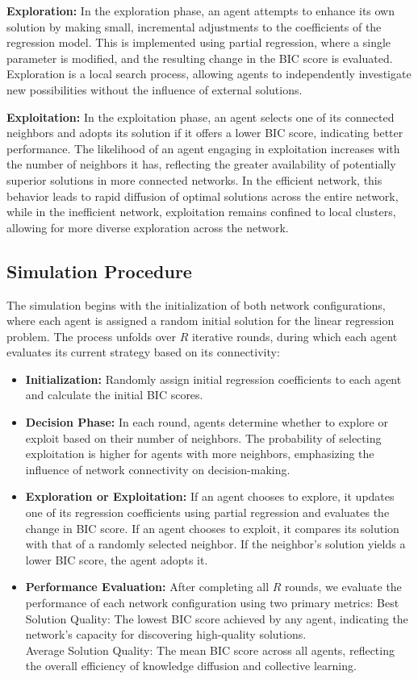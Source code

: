 \documentclass[conference]{IEEEtran}
\begin{document}
\textbf{Exploration: }
In the exploration phase, an agent attempts to enhance its own solution by making small, incremental adjustments to the coefficients of the regression model. This is implemented using partial regression, where a single parameter is modified, and the resulting change in the BIC score is evaluated. Exploration is a local search process, allowing agents to independently investigate new possibilities without the influence of external solutions.

\textbf{Exploitation: }
In the exploitation phase, an agent selects one of its connected neighbors and adopts its solution if it offers a lower BIC score, indicating better performance. The likelihood of an agent engaging in exploitation increases with the number of neighbors it has, reflecting the greater availability of potentially superior solutions in more connected networks. In the efficient network, this behavior leads to rapid diffusion of optimal solutions across the entire network, while in the inefficient network, exploitation remains confined to local clusters, allowing for more diverse exploration across the network.

\subsection{Simulation Procedure}
The simulation begins with the initialization of both network configurations, where each agent is assigned a random initial solution for the linear regression problem. The process unfolds over $R$ iterative rounds, during which each agent evaluates its current strategy based on its connectivity:

\begin{itemize}
    \item \textbf{Initialization: } Randomly assign initial regression coefficients to each agent and calculate the initial BIC scores.
    \item \textbf{Decision Phase: } In each round, agents determine whether to explore or exploit based on their number of neighbors. The probability of selecting exploitation is higher for agents with more neighbors, emphasizing the influence of network connectivity on decision-making.
    \item \textbf{Exploration or Exploitation: } If an agent chooses to explore, it updates one of its regression coefficients using partial regression and evaluates the change in BIC score.
    If an agent chooses to exploit, it compares its solution with that of a randomly selected neighbor. If the neighbor’s solution yields a lower BIC score, the agent adopts it.
    \item \textbf{Performance Evaluation: } After completing all $R$ rounds, we evaluate the performance of each network configuration using two primary metrics:
    Best Solution Quality: The lowest BIC score achieved by any agent, indicating the network’s capacity for discovering high-quality solutions. \\
    Average Solution Quality: The mean BIC score across all agents, reflecting the overall efficiency of knowledge diffusion and collective learning.
\end{itemize}
\end{document}
